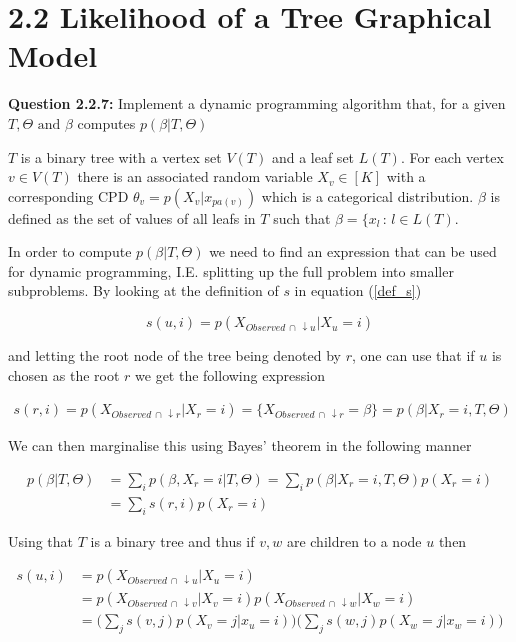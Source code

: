 \section*{2.2 Likelihood of a Tree Graphical Model}


\begin{tcolorbox}
\textbf{Question 2.2.7:}
Implement a dynamic programming algorithm that, for a given $T, \Theta \text{ and } \beta$ computes $p(\beta | T, \Theta)$
\end{tcolorbox}

$T$ is a binary tree with a vertex set $V(T)$ and a leaf set $L(T)$. For each vertex $v \in V(T)$ there is an associated random variable $X_v \in [K]$ with a corresponding CPD $\theta_v = p(X_v|x_{pa(v)})$ which is a categorical distribution. $\beta$ is defined as the set of values of all leafs in $T$ such that $\beta = \{x_l \, : \, l \in L(T)$.

In order to compute $p(\beta | T, \Theta)$ we need to find an expression that can be used for dynamic programming, I.E. splitting up the full problem into smaller subproblems. By looking at the definition of $s$ in equation (\ref{def_s})

\begin{equation}
  s(u,i) = p(X_{Observed \, \cap \, \downarrow u}| X_u = i)
  \label{def_s}
\end{equation}

and letting the root node of the tree being denoted by $r$, one can use that if $u$ is chosen as the root $r$ we get the following expression

\begin{align*}
  s(r,i) = p(X_{Observed \, \cap \, \downarrow r}| X_r = i) = \bigg\{ X_{Observed \, \cap \, \downarrow r} = \beta \bigg\} = p(\beta | X_r = i, T, \Theta)
\end{align*}

We can then marginalise this using Bayes' theorem in the following manner

\begin{align}
  p(\beta | T, \Theta) & = \sum_i p(\beta, X_r = i| T, \Theta) = \sum_i p(\beta | X_r = i, T, \Theta)p(X_r = i) \\
  & = \sum_i s(r,i)p(X_r = i)
  \label{sol_eq}
\end{align}

Using that $T$ is a binary tree and thus if $v, w$ are children to a node $u$ then

\begin{align}
  s(u,i) & = p(X_{Observed \, \cap \, \downarrow u}| X_u = i)\nonumber \\
  & = p(X_{Observed \, \cap \, \downarrow v}| X_v = i)
  p(X_{Observed \, \cap \, \downarrow w}| X_w = i) \nonumber\\
  & = \bigg( \sum_j s(v,j)p(X_v = j| x_u = i) \bigg )\bigg( \sum_j s(w,j)p(X_w = j| x_w = i) \bigg )
  \label{traverse_eq}
\end{align}

